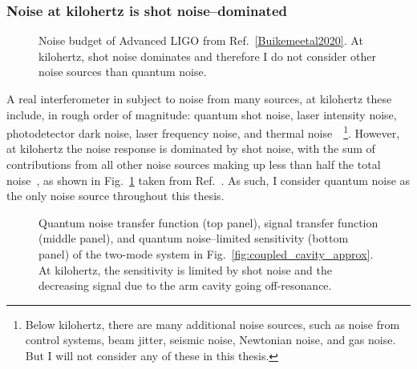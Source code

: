\subsubsection{Noise at kilohertz is shot noise--dominated}

\begin{figure}
	\centering
	\caption{Noise budget of Advanced LIGO from Ref.~\ref{Buikemeetal2020}. At kilohertz, shot noise dominates and therefore I do not consider other noise sources than quantum noise. }
	\label{fig:Buikemeetal2020_LIGO_noise_budget}
\end{figure}


A real interferometer in subject to noise from many sources, at kilohertz these include, in rough order of magnitude: quantum shot noise, laser intensity noise, photodetector dark noise, laser frequency noise, and thermal noise~\cite{Buikemeetal2020}~\footnote{Below kilohertz, there are many additional noise sources, such as noise from control systems, beam jitter, seismic noise, Newtonian noise, and gas noise. But I will not consider any of these in this thesis.}. However, at kilohertz the noise response is dominated by shot noise, with the sum of contributions from all other noise sources making up less than half the total noise~\cite{}, as shown in Fig.~\ref{fig:Buikemeetal2020_LIGO_noise_budget} taken from Ref.~\cite{Buikemeetal2020}. As such, I consider quantum noise as the only noise source throughout this thesis.

\begin{figure}
	\centering
	\caption{Quantum noise transfer function (top panel), signal transfer function (middle panel), and quantum noise--limited sensitivity (bottom panel) of the two-mode system in Fig.~\ref{fig:coupled_cavity_approx}. At kilohertz, the sensitivity is limited by shot noise and the decreasing signal due to the arm cavity going off-resonance.}
	\label{fig:simplified_sensitivity}
\end{figure}

